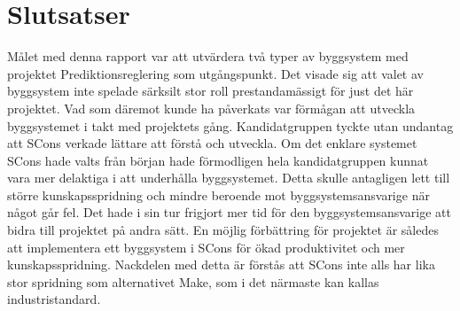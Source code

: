 \section{Slutsatser}
Målet med denna rapport var att utvärdera två typer av byggsystem med projektet Prediktionsreglering som utgångspunkt. Det visade sig att valet av byggsystem inte spelade särksilt stor roll prestandamässigt för just det här projektet. Vad som däremot kunde ha påverkats var förmågan att utveckla byggsystemet i takt med projektets gång. Kandidatgruppen tyckte utan undantag att SCons verkade lättare att förstå och utveckla.
\newline
\newline
Om det enklare systemet SCons hade valts från början hade förmodligen hela kandidatgruppen kunnat vara mer delaktiga i att underhålla byggsystemet. Detta skulle antagligen lett till större kunskapsspridning och mindre beroende mot byggsystemsansvarige när något går fel. Det hade i sin tur frigjort mer tid för den byggsystemsansvarige att bidra till projektet på andra sätt.
\newline
\newline
En möjlig förbättring för projektet är således att implementera ett byggsystem i SCons för ökad produktivitet och mer kunskapsspridning. Nackdelen med detta är förstås att SCons inte alls har lika stor spridning som alternativet Make, som i det närmaste kan kallas industristandard.
